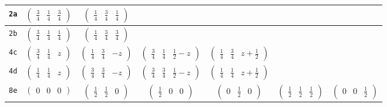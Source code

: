 \documentclass[fleqn,9pt,landscape]{jsarticle}
\begin{document}
\begin{center}
\begin{longtable}{ccccccc}
{\tt 2a} & $ \begin{pmatrix} \frac{3}{4} & \frac{1}{4} & \frac{3}{4} \end{pmatrix} $ & $ \begin{pmatrix} \frac{1}{4} & \frac{3}{4} & \frac{1}{4} \end{pmatrix} $ & $  $ & $  $ & $  $ & $  $ \\ \hline
{\tt 2b} & $ \begin{pmatrix} \frac{3}{4} & \frac{1}{4} & \frac{1}{4} \end{pmatrix} $ & $ \begin{pmatrix} \frac{1}{4} & \frac{3}{4} & \frac{3}{4} \end{pmatrix} $ & $  $ & $  $ & $  $ & $  $ \\ \hline
{\tt 4c} & $ \begin{pmatrix} \frac{3}{4} & \frac{1}{4} & z \end{pmatrix} $ & $ \begin{pmatrix} \frac{1}{4} & \frac{3}{4} & - z \end{pmatrix} $ & $ \begin{pmatrix} \frac{3}{4} & \frac{1}{4} & \frac{1}{2} - z \end{pmatrix} $ & $ \begin{pmatrix} \frac{1}{4} & \frac{3}{4} & z + \frac{1}{2} \end{pmatrix} $ & $  $ & $  $ \\ \hline
{\tt 4d} & $ \begin{pmatrix} \frac{1}{4} & \frac{1}{4} & z \end{pmatrix} $ & $ \begin{pmatrix} \frac{3}{4} & \frac{3}{4} & - z \end{pmatrix} $ & $ \begin{pmatrix} \frac{3}{4} & \frac{3}{4} & \frac{1}{2} - z \end{pmatrix} $ & $ \begin{pmatrix} \frac{1}{4} & \frac{1}{4} & z + \frac{1}{2} \end{pmatrix} $ & $  $ & $  $ \\ \hline
{\tt 8e} & $ \begin{pmatrix} 0 & 0 & 0 \end{pmatrix} $ & $ \begin{pmatrix} \frac{1}{2} & \frac{1}{2} & 0 \end{pmatrix} $ & $ \begin{pmatrix} \frac{1}{2} & 0 & 0 \end{pmatrix} $ & $ \begin{pmatrix} 0 & \frac{1}{2} & 0 \end{pmatrix} $ & $ \begin{pmatrix} \frac{1}{2} & \frac{1}{2} & \frac{1}{2} \end{pmatrix} $ & $ \begin{pmatrix} 0 & 0 & \frac{1}{2} \end{pmatrix} $ \\

\end{longtable}
\end{center}
\end{document}

